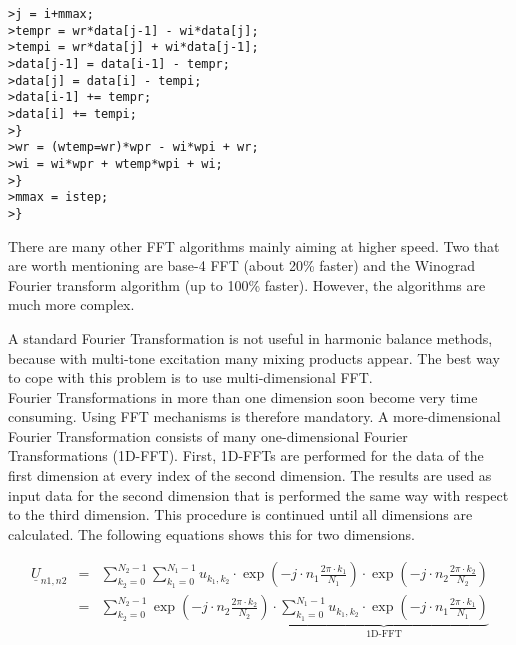 \texttt{>\quad \qquad\qquad\qquad j = i+mmax;} \\
\texttt{>\quad \qquad\qquad\qquad tempr = wr*data[j-1] - wi*data[j];} \\
\texttt{>\quad \qquad\qquad\qquad tempi = wr*data[j] + wi*data[j-1];} \\
\texttt{>\quad \qquad\qquad\qquad data[j-1] = data[i-1] - tempr;} \\
\texttt{>\quad \qquad\qquad\qquad data[j] = data[i] - tempi;} \\
\texttt{>\quad \qquad\qquad\qquad data[i-1] += tempr;} \\
\texttt{>\quad \qquad\qquad\qquad data[i] += tempi;} \\
\texttt{>\quad \qquad\qquad \}} \\
\texttt{>\quad \qquad\qquad wr = (wtemp=wr)*wpr - wi*wpi + wr;} \\
\texttt{>\quad \qquad\qquad wi = wi*wpr + wtemp*wpi + wi;} \\
\texttt{>\quad \qquad \}} \\
\texttt{>\quad \qquad mmax = istep;} \\
\texttt{>\quad \}} \\

\addvspace{12pt}

There are many other FFT algorithms mainly aiming at higher speed.
Two that are worth mentioning are base-4 FFT (about 20\% faster)
and the Winograd Fourier transform algorithm (up to 100\% faster).
However, the algorithms are much more complex.

\addvspace{12pt}

A standard Fourier Transformation is not useful in harmonic balance
methods, because with multi-tone excitation many mixing products appear.
The best way to cope with this problem is to use multi-dimensional
FFT.\\
Fourier Transformations in more than one dimension soon become
very time consuming. Using FFT mechanisms is therefore mandatory.
A more-dimensional Fourier Transformation consists of many
one-dimensional Fourier Transformations (1D-FFT). First, 1D-FFTs
are performed for the data of the first dimension at every index
of the second dimension. The results are used as input data for
the second dimension that is performed the same way with respect
to the third dimension. This procedure is continued until all
dimensions are calculated. The following equations shows this
for two dimensions.

\begin{eqnarray}
\underline{U}_{n1,n2} & = & \sum_{k_2=0}^{N_2-1} \sum_{k_1=0}^{N_1-1}
   u_{k_1,k_2}\cdot \exp\left( -j\cdot n_1\frac{2\pi\cdot k_1}{N_1} \right)
              \cdot \exp\left( -j\cdot n_2\frac{2\pi\cdot k_2}{N_2} \right) \\
 & = & \sum_{k_2=0}^{N_2-1} \exp\left( -j\cdot n_2\frac{2\pi\cdot k_2}{N_2} \right)
       \cdot \underbrace{ \sum_{k_1=0}^{N_1-1}
   u_{k_1,k_2}\cdot \exp\left( -j\cdot n_1\frac{2\pi\cdot k_1}{N_1} \right) }_\text{1D-FFT}
\end{eqnarray}


